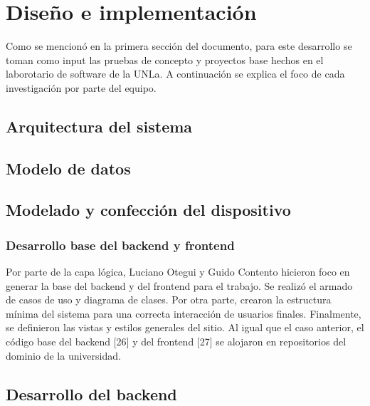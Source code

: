 \chapter{Diseño e implementación} %
Como se mencionó en la primera sección del documento, para este desarrollo se toman como input las pruebas de concepto y proyectos base hechos en el laborotario de software de la UNLa. A continuación se explica el foco de cada investigación por parte del equipo.

\section{Arquitectura del sistema}


\section{Modelo de datos}


\section{Modelado y confección del dispositivo }


\subsection{Desarrollo base del backend y frontend}
Por parte de la capa lógica, Luciano Otegui y Guido Contento hicieron foco en generar la base del backend y del frontend para el trabajo. Se realizó el armado de casos de uso y diagrama de clases. Por otra parte, crearon la estructura mínima del sistema para una correcta interacción de usuarios finales. Finalmente, se definieron las vistas y estilos generales del sitio. Al igual que el caso anterior, el código base del backend [26] y del frontend [27] se alojaron en repositorios del dominio de la universidad.

\section{Desarrollo del backend}

